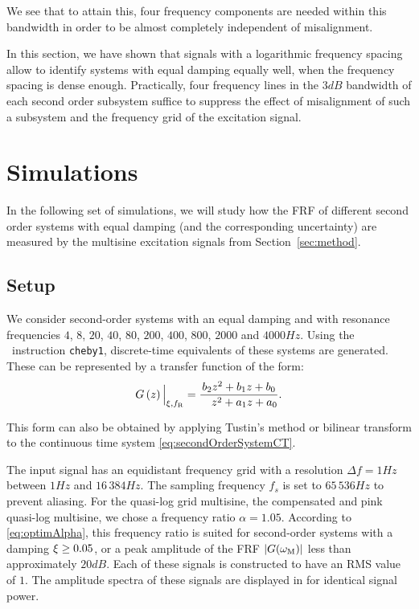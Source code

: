   We see that to attain this, four frequency components are needed within this bandwidth in order to be almost completely independent of misalignment.

  In this section, we have shown that signals with a logarithmic frequency spacing allow to identify systems with equal damping equally well, when the frequency spacing is dense enough.
  Practically, four frequency lines in the $3\unit{dB}$ bandwidth of each second order subsystem suffice to suppress the effect of misalignment of such a subsystem and the frequency grid of the excitation signal.
  
\section{Simulations} \label{sec:excitation:simulation}
In the following set of simulations, we will study how the FRF of different second order systems with equal damping (and the corresponding uncertainty) are measured by the multisine excitation signals from Section~\ref{sec:method}.
  \subsection{Setup}
  We consider second-order systems with an equal damping and with resonance frequencies $4$, $8$, $20$, $40$, $80$, $200$, $400$, $800$, $2000$ and $4000 \unit{Hz}$.
  Using the \matlab\ instruction \texttt{cheby1}, discrete-time equivalents of these systems are generated.
  These can be represented by a transfer function of the form:
  \begin{equation}
    G \left( z \right)\Big|_{\damping, \fR} =
       \frac{         b_2  z^{2} + b_1 z + b_0}%
            {\phantom{a_2} z^{2} + a_1 z + a_0}
  \text{.}
  \label{eq:excitation:secondOrderSystemDTidentifiable}
  \end{equation}

  This form can also be obtained by applying Tustin's method or bilinear transform \citep{Oppenheim1983} to the continuous time system \eqref{eq:secondOrderSystemCT}.

  The input signal has an equidistant frequency grid with a resolution $\Delta f = 1\unit{Hz}$ between $1 \unit{Hz}$ and $16\,384\unit{Hz}$.
  The sampling frequency $f_s$ is set to $65\,536\unit{Hz}$ to prevent aliasing.
  For the quasi-log grid multisine, the compensated and pink quasi-log multisine, we chose a frequency ratio $\alpha = 1.05$.
  According to \eqref{eq:optimAlpha}, this frequency ratio is suited for second-order systems with a damping $\xi \geq 0.05$, or a peak amplitude of the FRF $\left| G(\omega_{\mathrm{M}}) \right|$ less than approximately $20\unit{dB}$.
  Each of these signals is constructed to have an RMS value of $1$.
  The amplitude spectra of these signals are displayed in  for identical signal power.


